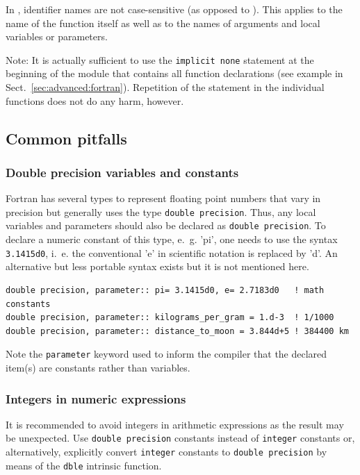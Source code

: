 \documentclass[times,onecolumn]{article}
\begin{document}
In , identifier names are not case-sensitive (as opposed to ). This applies to the name of the function itself as well as to the names of arguments and local variables or parameters.

Note: It is actually sufficient to use the \verb|implicit none| statement at the beginning of the module that contains all function declarations (see example in Sect.~\ref{sec:advanced:fortran}). Repetition of the statement in the individual functions does not do any harm, however. 

\subsection{Common pitfalls}

\subsubsection{Double precision variables and constants}

Fortran has several types to represent floating point numbers that vary in precision but  generally uses the type \verb|double precision|. Thus, any local variables and parameters should also be declared as \verb|double precision|. To declare a numeric constant of this type, e.~g. 'pi', one needs to use the syntax \verb|3.1415d0|, i.~e. the conventional 'e' in scientific notation is replaced by 'd'. An alternative but less portable syntax exists but it is not mentioned here.

\begin{shaded}
\begin{small}
\begin{verbatim}
double precision, parameter:: pi= 3.1415d0, e= 2.7183d0   ! math constants 
double precision, parameter:: kilograms_per_gram = 1.d-3  ! 1/1000
double precision, parameter:: distance_to_moon = 3.844d+5 ! 384400 km
\end{verbatim}
\end{small}
\end{shaded}

Note the \verb|parameter| keyword used to inform the compiler that the declared item(s) are constants rather than variables.

\subsubsection{Integers in numeric expressions}

It is recommended to avoid integers in arithmetic expressions as the result may be unexpected. Use \verb|double precision| constants instead of \verb|integer| constants or, alternatively, explicitly convert \verb|integer| constants to \verb|double precision| by means of the \verb|dble| intrinsic function.
\end{document}
